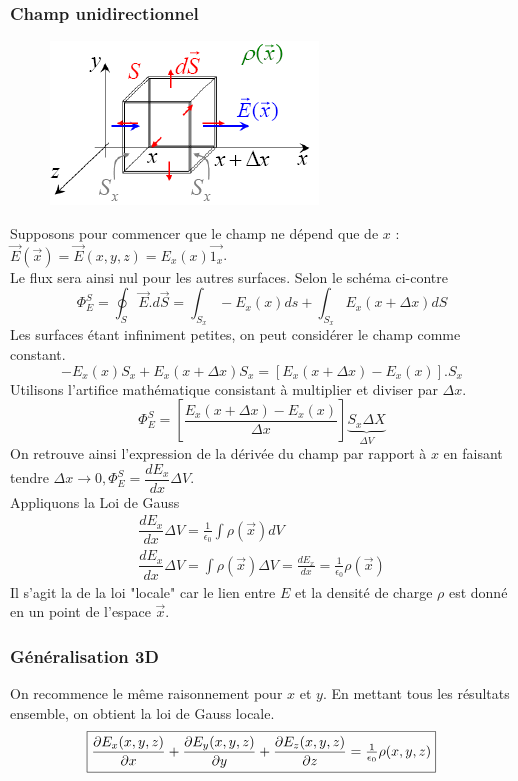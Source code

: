 \documentclass	[11pt, a4paper, openany]{book}
\begin{document}
\subsubsection{Champ unidirectionnel}
\begin{figure}
\includegraphics[scale=0.44]{es/image8.png}
\end{figure}
Supposons pour commencer que le champ ne dépend que de $x$ : $\vec{E}(\vec{x}) = \vec{E}(x,y,z) = E_x(x)\vec{1_x}$.\\
Le flux sera ainsi nul pour les autres surfaces. Selon le schéma ci-contre
\begin{equation}
\Phi^S_E = \oint_S \vec{E}.d\vec{S} = \int_{S_x} -E_x(x)ds +  \int_{S_x} E_x(x+\Delta x)dS
\end{equation}
Les surfaces étant infiniment petites, on peut considérer le champ comme constant.
\begin{equation}
-E_x(x)S_x + E_x(x+\Delta x)S_x = \left[E_x(x+\Delta x) - E_x(x)\right].S_x
\end{equation}
Utilisons l'artifice mathématique consistant à multiplier et diviser par $\Delta x$.
\begin{equation}
\Phi^S_E = \left[\frac{E_x(x+\Delta x) - E_x(x)}{\Delta x}\right]\underbrace{S_x\Delta X}_{\Delta V}
\end{equation}
On retrouve ainsi l'expression de la dérivée du champ par rapport à $x$ en faisant tendre $\Delta x \rightarrow 0, \Phi_E^S = \dfrac{dE_x}{dx}\Delta V$.\\
Appliquons la Loi de Gauss
\begin{eqnarray}
\dfrac{dE_x}{dx}\Delta V = \frac{1}{\epsilon_0}\int \rho(\vec x) dV\\
\dfrac{dE_x}{dx}\Delta V =\int \rho(\vec x) \Delta V =
\frac{dE_x}{dx} = \frac{1}{\epsilon_0}\rho(\vec{x})
\end{eqnarray}
Il s'agit la de la loi "locale" car le lien entre $E$ et la densité de charge $\rho$ est donné en un point de l'espace $\vec{x}$.

\subsubsection{Généralisation 3D}
On recommence le même raisonnement pour $x$ et $y$. En mettant tous les résultats ensemble, on obtient la loi de Gauss locale. 
\begin{equation}
\fbox{$\dfrac{\partial E_x(x,y,z)}{\partial x} + \dfrac{\partial E_y(x,y,z)}{\partial y} + \dfrac{\partial E_z(x,y,z)}{\partial z} = \frac{1}{\epsilon_0}\rho(x,y,z)$}
\end{equation}
\end{document}
